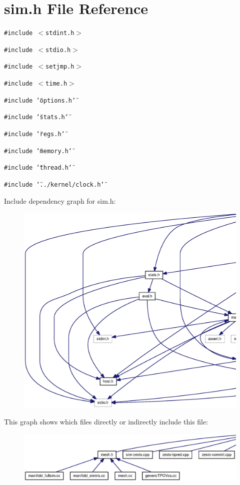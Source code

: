 \section{sim.h File Reference}
\label{sim_8h}
{\tt \#include $<$stdint.h$>$}\par
{\tt \#include $<$stdio.h$>$}\par
{\tt \#include $<$setjmp.h$>$}\par
{\tt \#include $<$time.h$>$}\par
{\tt \#include \char`\"{}options.h\char`\"{}}\par
{\tt \#include \char`\"{}stats.h\char`\"{}}\par
{\tt \#include \char`\"{}regs.h\char`\"{}}\par
{\tt \#include \char`\"{}memory.h\char`\"{}}\par
{\tt \#include \char`\"{}thread.h\char`\"{}}\par
{\tt \#include \char`\"{}../kernel/clock.h\char`\"{}}\par


Include dependency graph for sim.h:\nopagebreak
\begin{figure}[H]
\begin{center}
\leavevmode
\includegraphics[width=420pt]{sim_8h__incl}
\end{center}
\end{figure}


This graph shows which files directly or indirectly include this file:\nopagebreak
\begin{figure}[H]
\begin{center}
\leavevmode
\includegraphics[width=420pt]{sim_8h__dep__incl}
\end{center}
\end{figure}
